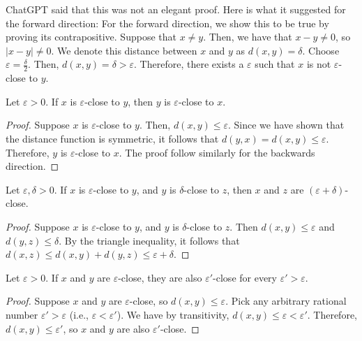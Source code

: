 ChatGPT said that this was not an elegant proof. Here is what it suggested for the forward direction:
For the forward direction, we show this to be true by proving its contrapositive.
Suppose that $x \neq y.$ Then, we have that $x - y \neq 0$, so $\lvert x - y \rvert \neq 0.$
We denote this distance between $x$ and $y$ as $d(x, y) = \delta.$ 
Choose $\varepsilon = \frac{\delta}{2}.$ 
Then, $d(x, y) = \delta > \varepsilon.$
Therefore, there exists a $\varepsilon$ such that $x$ is not $\varepsilon$-close to $y$.

\begin{proposition}
    Let $\varepsilon > 0.$ 
    If $x$ is $\varepsilon$-close to $y$, then $y$ is $\varepsilon$-close to $x$.
\end{proposition}
\begin{proof}
    Suppose $x$ is $\varepsilon$-close to $y$. 
    Then, $d(x, y) \leq \varepsilon.$
    Since we have shown that the distance function is symmetric, it follows that $d(y, x) = d(x, y) \leq \varepsilon.$
    Therefore, $y$ is $\varepsilon$-close to $x.$
    The proof follow similarly for the backwards direction.
\end{proof}

\begin{proposition}
    Let $\varepsilon, \delta > 0.$ If $x$ is $\varepsilon$-close to $y$, and $y$ is $\delta$-close to $z$, then $x$ and $z$ are $(\varepsilon + \delta)$-close. 
\end{proposition}
\begin{proof}
    Suppose $x$ is $\varepsilon$-close to $y$, and $y$ is $\delta$-close to $z$.
    Then $d(x, y) \leq \varepsilon$ and $d(y, z) \leq \delta$.
    By the triangle inequality, it follows that $d(x, z) \leq d(x, y) + d(y, z) \leq \varepsilon + \delta.$
\end{proof}

\begin{proposition}
    Let $\varepsilon > 0.$ If $x$ and $y$ are $\varepsilon$-close, they are also $\varepsilon'$-close for every $\varepsilon' > \varepsilon$.
\end{proposition}
\begin{proof}
    Suppose $x$ and $y$ are $\varepsilon$-close, so $d(x, y) \leq \varepsilon.$
    Pick any arbitrary rational number $\varepsilon ' > \varepsilon$ (i.e., $\varepsilon < \varepsilon '$).
    We have by transitivity, $d(x, y) \leq \varepsilon < \varepsilon '$.
    Therefore, $d(x, y) \leq \varepsilon '$, so $x$ and $y$ are also $\varepsilon '$-close.
\end{proof}

